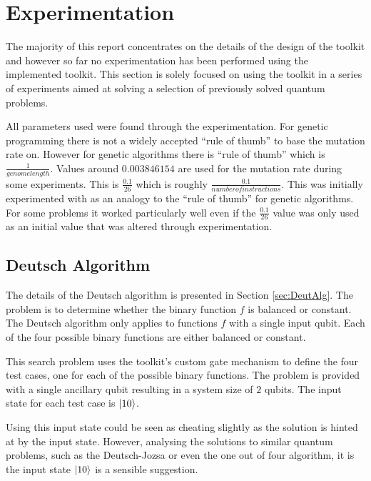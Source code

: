 \chapter{Experimentation}
\label{sec:experimentation}

The majority of this report concentrates on the details of the design of the toolkit and however so far no experimentation has been performed using the implemented toolkit.
This section is solely focused on using the toolkit in a series of experiments aimed at solving a selection of previously solved quantum problems.

All parameters used were found through the experimentation.
For genetic programming there is not a widely accepted ``rule of thumb'' to base the mutation rate on.
However for genetic algorithms there is ``rule of thumb'' which is $\frac{1}{genome length}$\cite{Ochoa}.
Values around $0.003846154$ are used for the mutation rate during some experiments.
This is $\frac{0.1}{26}$ which is roughly $\frac{0.1}{number of instructions}$.
This was initially experimented with as an analogy to the ``rule of thumb'' for genetic algorithms.
For some problems it worked particularly well even if the $\frac{0.1}{26}$ value was only used as an initial value that was altered through experimentation.

\section{Deutsch Algorithm}
\label{sec:deutschexperiment}
The details of the Deutsch algorithm is presented in Section \ref{sec:DeutAlg}.
The problem is to determine whether the binary function $f$ is balanced or constant.
The Deutsch algorithm only applies to functions $f$ with a single input qubit.
Each of the four possible binary functions are either balanced or constant.

This search problem uses the toolkit's custom gate mechanism to define the four test cases, one for each of the possible binary functions.
The problem is provided with a single ancillary qubit resulting in a system size of $2$ qubits.
The input state for each test case is $\left\vert{10}\right\rangle$.

Using this input state could be seen as cheating slightly as the solution is hinted at by the input state.
However, analysing the solutions to similar quantum problems, such as the Deutsch-Jozsa or even the one out of four algorithm, it is the input state $\left\vert{10}\right\rangle$ is a sensible suggestion.


